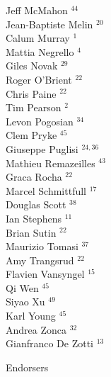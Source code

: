 \documentclass[PICOReport.tex]{subfiles}
\begin{document}
{\begin{multicols}{4}
Jeff McMahon $^{44}$                    \\
Jean-Baptiste Melin $^{20}$             \\
Calum Murray $^{1}$                    \\
Mattia Negrello $^{4}$                 \\
Giles Novak $^{29}$                     \\
Roger O'Brient $^{22}$                  \\
Chris Paine $^{22}$                     \\
Tim Pearson $^{2}$                     \\
Levon Pogosian $^{34}$                  \\
Clem Pryke $^{45}$                      \\
Giuseppe Puglisi $^{24, 36}$                \\
Mathieu Remazeilles $^{43}$             \\
Graca Rocha $^{22}$                     \\
Marcel Schmittfull $^{17}$              \\
Douglas Scott $^{38}$                   \\
Ian Stephens $^{11}$                    \\
Brian Sutin $^{22}$                     \\
Maurizio Tomasi $^{37}$                 \\
Amy Trangsrud $^{22}$                   \\
Flavien Vansyngel $^{15}$               \\
Qi Wen $^{45}$                          \\
Siyao Xu $^{49}$                        \\
Karl Young $^{45}$                      \\
Andrea Zonca $^{32}$                    \\
Gianfranco De Zotti $^{13}$             
\end{multicols}
}

\Large { \centerline {Endorsers}}
\end{document}
